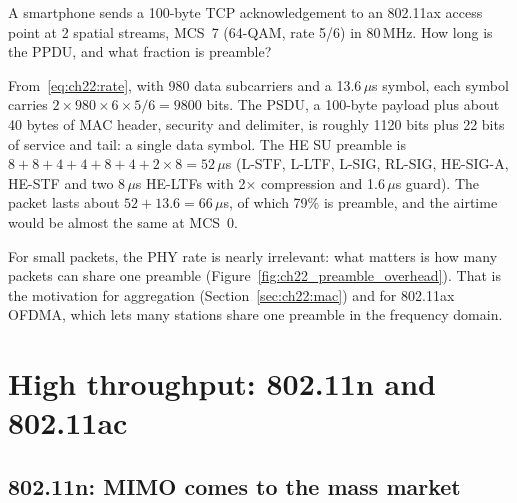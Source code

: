 \begin{worked}
A smartphone sends a 100-byte TCP acknowledgement to an 802.11ax access point at 2 spatial streams,
MCS~7 (64-QAM, rate 5/6) in 80\,MHz. How long is the PPDU, and what fraction is preamble?

From~\eqref{eq:ch22:rate}, with 980 data subcarriers and a 13.6\,$\mu$s symbol, each symbol carries
$2\times980\times6\times5/6=9800$ bits. The PSDU, a 100-byte payload plus about 40 bytes of MAC
header, security and delimiter, is roughly 1120 bits plus 22 bits of service and tail: a single
data symbol. The HE SU preamble is $8+8+4+4+8+4+2\times8=52$\,$\mu$s (L-STF, L-LTF, L-SIG, RL-SIG,
HE-SIG-A, HE-STF and two 8\,$\mu$s HE-LTFs with 2$\times$ compression and 1.6\,$\mu$s guard). The
packet lasts about $52+13.6=66$\,$\mu$s, of which 79\% is preamble, and the airtime would be almost
the same at MCS~0.

For small packets, the PHY rate is nearly irrelevant: what matters is how many packets can share
one preamble (Figure~\ref{fig:ch22_preamble_overhead}). That is the motivation for aggregation
(Section~\ref{sec:ch22:mac}) and for 802.11ax OFDMA, which lets many stations share one preamble in
the frequency domain.
\end{worked}


\section{High throughput: 802.11n and 802.11ac}
\label{sec:ch22:htvht}

\subsection{802.11n: MIMO comes to the mass market}

